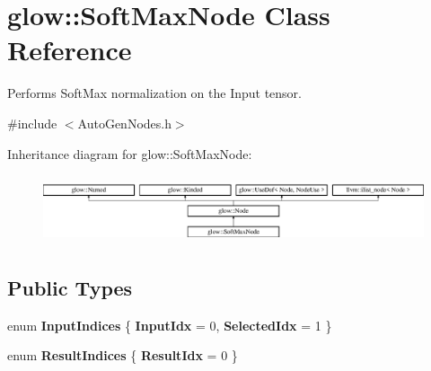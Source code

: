 \hypertarget{classglow_1_1_soft_max_node}{}\section{glow\+:\+:Soft\+Max\+Node Class Reference}
\label{classglow_1_1_soft_max_node}


Performs Soft\+Max normalization on the Input tensor.  




{\ttfamily \#include $<$Auto\+Gen\+Nodes.\+h$>$}

Inheritance diagram for glow\+:\+:Soft\+Max\+Node\+:\begin{figure}[H]
\begin{center}
\leavevmode
\includegraphics[height=2.028986cm]{classglow_1_1_soft_max_node}
\end{center}
\end{figure}
\subsection*{Public Types}
\begin{DoxyCompactItemize}
\item 
\mbox{\label{classglow_1_1_soft_max_node_a84d00cde585a9f768a2bafeec9dcfe68}} 
enum {\bfseries Input\+Indices} \{ {\bfseries Input\+Idx} = 0, 
{\bfseries Selected\+Idx} = 1
 \}
\item 
\mbox{\label{classglow_1_1_soft_max_node_ac0aacc06d5ecb531ed645f868b958bac}} 
enum {\bfseries Result\+Indices} \{ {\bfseries Result\+Idx} = 0
 \}
\end{DoxyCompactItemize}
